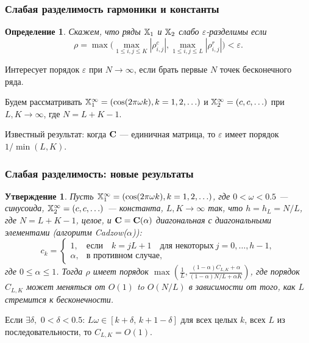 \documentclass[unicode, notheorems]{beamer}
\newtheorem{definition}{Определение}
\newtheorem{proposition}{Утверждение}
\begin{document}
\begin{frame}
	\frametitle{Слабая разделимость гармоники и константы}
	\begin{definition}
		Скажем, что ряды $\mathbb{X}_1$ и $\mathbb{X}_2$ \emph{слабо $\varepsilon$-разделимы} если
		\begin{equation*}
			\rho = \max\Big(\max_{1 \le i,j \le K}|\rho^c_{i,j}|, \max_{1 \le i,j \le L}|\rho^r_{i,j}|\Big) < \varepsilon.
		\end{equation*}
	\end{definition}
	Интересует порядок $\varepsilon$ при $N \to \infty$, если брать первые $N$ точек бесконечного ряда.
	
	Будем рассматривать $\mathbb{X}_1^\infty = (\cos(2 \pi \omega k), k = 1, 2, \ldots)$ и $\mathbb{X}_2^\infty = (c, c, \ldots)$ при $L, K \to \infty$, где $N = L + K - 1$.
	
	\vspace{0.3cm}
	Известный результат: когда $\mathbf{C}$ --- единичная матрица, то $\varepsilon$ имеет порядок $1/\min(L,K)$.
\end{frame}

\begin{frame}
	\frametitle{Слабая разделимость: новые результаты}
\begin{proposition}
	Пусть $\mathbb{X}_1^\infty = (\cos(2 \pi \omega k), k = 1, 2, \ldots)$, где $0<\omega <0.5$ --- синусоида, $\mathbb{X}_2^\infty = (c, c, \ldots)$ --- константа,  $L,K \to \infty$ так, что $h = h_L = N/L$, где $N=L+K-1$, целое, и $\mathbf{C}=\mathbf{C}(\alpha)$ диагональная с диагональными элементами (алгоритм Cadzow($\alpha$)):
	\begin{equation*}
	c_k = \begin{cases}
	1, & \text{если} \quad k = jL+1 \quad \text{для некоторых} \ j = 0, \ldots, h-1,\\
	\alpha, & \text{в противном случае},
	\end{cases}
	\end{equation*}
	где $0 \le \alpha \le 1$. Тогда $\rho$ имеет порядок $\max\left(\frac{1}{L}, \frac{(1-\alpha)C_{L,K}+\alpha}{(1-\alpha)N/L+\alpha K}\right)$, где порядок $C_{L,K}$
	может меняться от $O(1)$ to $O(N/L)$ в зависимости от того, как $L$ стремится к бесконечности.
	\end{proposition}
    \small Если $\exists \delta,$ $0 < \delta < 0.5$: $L \omega \in [k + \delta, \, k + 1 - \delta]$ для всех целых $k$, всех $L$ из последовательности, то $C_{L, K} = O(1)$.
\end{frame}
\end{document}
